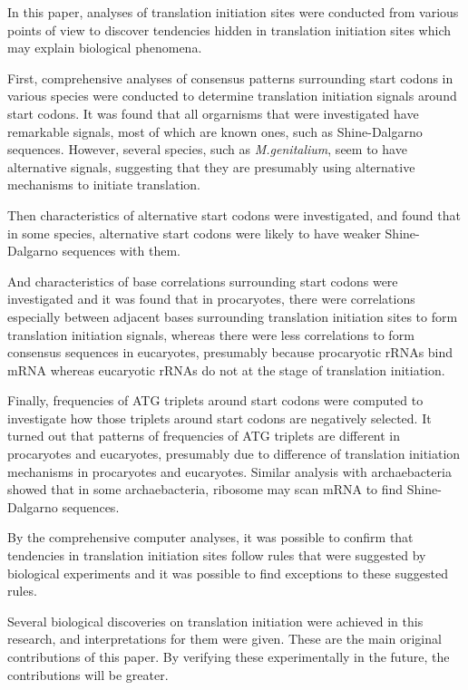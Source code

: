 
In this paper, analyses of translation initiation sites were conducted
from various points of view to discover tendencies hidden in
translation initiation sites which may explain biological phenomena.

First, comprehensive analyses of consensus patterns surrounding start
codons in various species were conducted to determine translation
initiation signals around start codons. It was found that all
orgarnisms that were investigated have remarkable signals, most of
which are known ones, such as Shine-Dalgarno sequences. However,
several species, such as {\it M.genitalium}, seem to have
alternative signals, suggesting that they are presumably using
alternative mechanisms to initiate translation.

Then characteristics of alternative start codons were investigated,
and found that in some species, alternative start codons were likely
to have weaker Shine-Dalgarno sequences with them. 

And characteristics of base correlations surrounding start codons
were investigated and it was found that in procaryotes, there were
correlations especially between adjacent bases surrounding translation
initiation sites to form translation initiation signals,
whereas there were less correlations to form consensus sequences in
eucaryotes, presumably because procaryotic rRNAs bind mRNA whereas
eucaryotic rRNAs do not at the stage of translation initiation.

Finally, frequencies of ATG triplets around start codons were computed
to investigate how those triplets around start codons are negatively
selected. It turned out that patterns of frequencies of ATG triplets are
different in procaryotes and eucaryotes, presumably due to difference of
translation initiation mechanisms in procaryotes and eucaryotes.
Similar analysis with archaebacteria showed that in some archaebacteria,
ribosome may scan mRNA to find Shine-Dalgarno sequences.

By the comprehensive computer analyses, it was possible to confirm
that tendencies in translation initiation sites follow rules that were
suggested by biological experiments and it was possible to find
exceptions to these suggested rules.

Several biological discoveries on translation initiation were achieved
in this research, and interpretations for them were given. These are
the main original contributions of this paper. By verifying these
experimentally in the future, the contributions will be greater.



